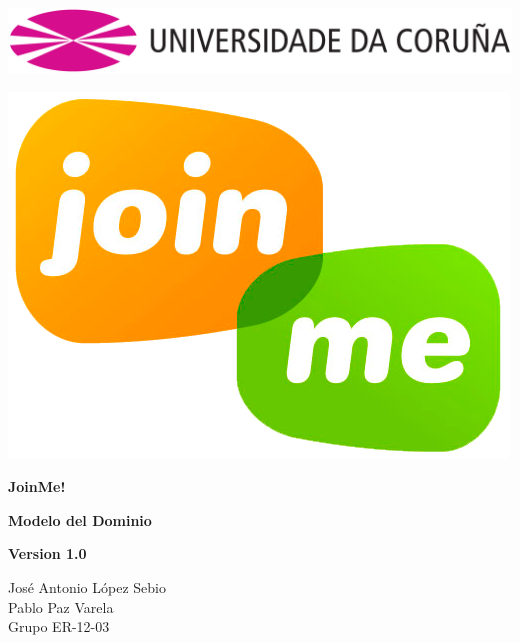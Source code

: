 \documentclass[12pt, a4paper, titlepage]{article}
\begin{document}

\begin{titlepage}

\includegraphics[width=15cm]{Imagenes/Simbolo_logo_UDC.png}

\vspace{3cm}

\begin{center}
\includegraphics[scale=0.3]{Imagenes/1a_Practica_ER_14-15.png}
\end{center}


\begin{flushright}
	
	\LARGE{\textbf{ JoinMe!}}
	
	\LARGE{\textbf{Modelo del Dominio}}
	
	\large{\textbf{Version 1.0}}
\end{flushright}
\vspace{1cm}
\begin{center}
José Antonio López Sebio\\
Pablo Paz Varela\\
Grupo ER-12-03\\
\end{center}


\end{titlepage}
\end{document}
